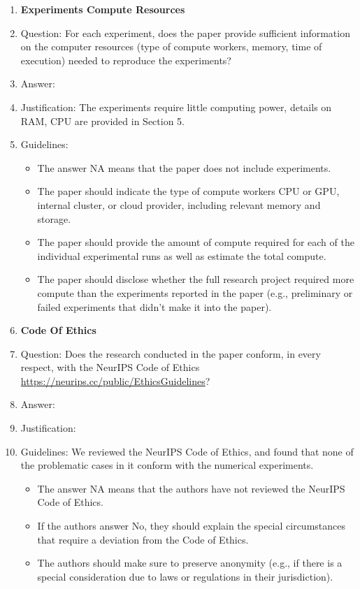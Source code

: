 \documentclass{article}
\begin{document}
\begin{enumerate}
\item {\bf Experiments Compute Resources}
    \item[] Question: For each experiment, does the paper provide sufficient information on the computer resources (type of compute workers, memory, time of execution) needed to reproduce the experiments?
    \item[] Answer: \answerYes{} %
    \item[] Justification: The experiments require little computing power, details on RAM, CPU are provided in Section 5.
    \item[] Guidelines:
    \begin{itemize}
        \item The answer NA means that the paper does not include experiments.
        \item The paper should indicate the type of compute workers CPU or GPU, internal cluster, or cloud provider, including relevant memory and storage.
        \item The paper should provide the amount of compute required for each of the individual experimental runs as well as estimate the total compute.
        \item The paper should disclose whether the full research project required more compute than the experiments reported in the paper (e.g., preliminary or failed experiments that didn't make it into the paper).
    \end{itemize}

\item {\bf Code Of Ethics}
    \item[] Question: Does the research conducted in the paper conform, in every respect, with the NeurIPS Code of Ethics \url{https://neurips.cc/public/EthicsGuidelines}?
    \item[] Answer: \answerYes{} %
    \item[] Justification: 
    \item[] Guidelines:
    We reviewed the NeurIPS Code of Ethics, and found that none of the problematic cases in it conform with the numerical experiments.
    \begin{itemize}
        \item The answer NA means that the authors have not reviewed the NeurIPS Code of Ethics.
        \item If the authors answer No, they should explain the special circumstances that require a deviation from the Code of Ethics.
        \item The authors should make sure to preserve anonymity (e.g., if there is a special consideration due to laws or regulations in their jurisdiction).
    \end{itemize}



\end{enumerate}
\end{document}

